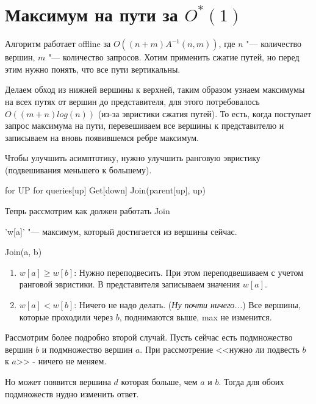 \chapter{Максимум на пути за \texorpdfstring{$O^*(1)$}{O*(1)}}

Алгоритм работает offline за $O((n+m)A^{-1}(n, m))$, где $n$ "--- количество вершин, $m$ "--- количество запросов.
Хотим применить сжатие путей, но перед этим нужно понять, что все пути вертикальны.


Делаем обход из нижней вершины к верхней, таким образом узнаем максимумы на всех путях от вершин до представителя, для этого потребовалось $O((m + n)log(n))$
(из-за эвристики сжатия путей).
То есть, когда поступает запрос максимума на пути, перевешиваем все вершины к представителю и записываем на вновь появившемся ребре максимум. 

Чтобы улучшить асимптотику, нужно улучшить ранговую эвристику (подвешивания меньшего к большему).


\begin{cppcode}
for UP
	for queries[up]
		Get[down]
Join(parent[up], up)
\end{cppcode}

Тепрь рассмотрим как должен работать Join

\cpp'w[a]' "--- максимум, который достигается из вершины сейчас.


Join(a, b)
\begin{enumerate}
\item
	$w[a] \ge w[b]$:
	Нужно переподвесить. При этом переподвешиваем с учетом ранговой эвристики. 
	В представителя записываем значения $w[a]$.

\item
	$w[a] < w[b]$:
	Ничего не надо делать. (\textit{Ну почти ничего...})
	Все вершины, которые проходили через $b$, поднимаются выше, max не изменится.
\end{enumerate}

Рассмотрим более подробно второй случай.
Пусть сейчас есть подмножество вершин $b$ и подмножество вершин $a$.
При рассмотрение <<нужно ли подвесть $b$ к $a$>> - ничего не меняем.

Но может появится вершина $d$ которая больше, чем $a$ и $b$. Тогда для обоих подмножеств нудно изменить ответ.


